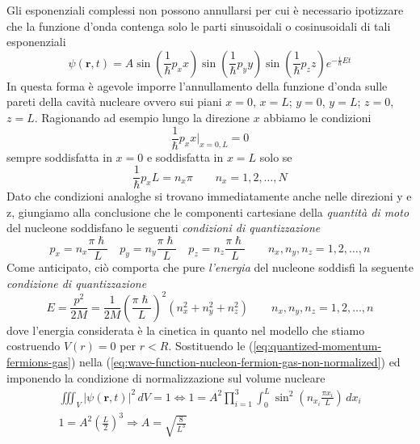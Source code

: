 Gli esponenziali complessi non possono annullarsi per cui è necessario ipotizzare che la funzione d’onda contenga solo le parti sinusoidali o cosinusoidali di tali esponenziali
\begin{equation}
	\psi(\bm{r},t) = A \sin\left(  \frac{1}{\hslash}p_{x}x \right) \sin\left(  \frac{1}{\hslash}p_{y}y \right) \sin\left(  \frac{1}{\hslash}p_{z}z \right) e^{ - \frac{i}{\hslash}Et }
	\label{eq:wave-function-nucleon-fermion-gas-non-normalized}
\end{equation}
In questa forma è agevole imporre l’annullamento della funzione d’onda sulle pareti della cavità nucleare ovvero sui piani $x=0$, $x=L$;  $y=0$, $y=L$; $z=0$, $z=L$.
Ragionando ad esempio lungo la direzione $x$ abbiamo le condizioni
\[
\frac{1}{\hslash} p_{x}x \big|_{x = 0,L} = 0
\]
sempre soddisfatta in $x=0$ e soddisfatta in $x=L$ solo se
\[
\frac{1}{\hslash}p_{x}L = n_{x} \pi \qquad n_{x} = 1,2, \dots, N
\]
Dato che condizioni analoghe si trovano immediatamente anche nelle direzioni y e z, giungiamo alla conclusione che le componenti cartesiane della \emph{quantità di moto} del nucleone soddisfano le seguenti \emph{condizioni di quantizzazione}
\begin{equation}
	p_{x} = n_{x} \frac{\pi \hslash}{L} \quad
	p_{y} = n_{y} \frac{\pi \hslash}{L} \quad
	p_{z} = n_{z} \frac{\pi \hslash}{L} \qquad
	n_{x},n_{y},n_{z} = 1,2, \dots , n
	\label{eq:quantized-momentum-fermions-gas}
\end{equation}
Come anticipato, ciò comporta che pure \emph{l’energia} del nucleone soddisfi la seguente \emph{condizione di quantizzazione}
\begin{equation}
	E = \frac{p^{2}}{2 M} = \frac{1}{2 M} \left( \frac{\pi \hslash}{L} \right)^{2} (n_{x}^{2} + n_{y}^{2}+n_{z}^{2}) \qquad
	n_{x},n_{y},n_{z} = 1,2, \dots , n
	\label{eq:energy-nucleon-fermions-gas}
\end{equation}
dove l'energia considerata è la cinetica in quanto nel modello che stiamo costruendo $ V(r) = 0$ per $ r< R$.
Sostituendo le (\ref{eq:quantized-momentum-fermions-gas}) nella (\ref{eq:wave-function-nucleon-fermion-gas-non-normalized})
ed imponendo la condizione di normalizzazione sul volume nucleare
\begin{gather*}
    \iiint_{V} |\psi(\bm{r},t) |^{2} \, dV = 1 \iff
1 = A^{2} \prod_{i = 1}^{3} \int_{0}^{L} \sin ^{2}\left( n_{x_{i}} \frac{\pi x_{i}}{L} \right) \, dx_{i}\\
    1 = A^{2} \left( \frac{L}{2} \right)^{3} \Longrightarrow A = \sqrt{ \frac{8}{L^{3}} }
\end{gather*}
